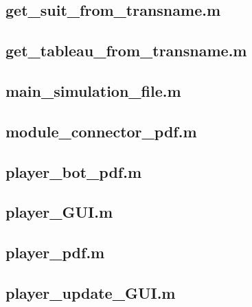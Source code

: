 \documentclass[runningheads,a4paper]{llncs}
\newcommand{\GPenSIM}{../GPenSIM}
\begin{document}
\subsection{get\_suit\_from\_transname.m}
\label{app:get_suit_from_transname.m}


\subsection{get\_tableau\_from\_transname.m}
\label{app:get_tableau_from_transname.m}


\subsection{main\_simulation\_file.m}
\label{app:main_simulation_file.m}


\subsection{module\_connector\_pdf.m}
\label{app:module_connector_pdf.m}


\subsection{player\_bot\_pdf.m}
\label{app:player_bot_pdf.m}


\subsection{player\_GUI.m}
\label{app:player_GUI.m}


\subsection{player\_pdf.m}
\label{app:player_pdf.m}


\subsection{player\_update\_GUI.m}
\label{app:player_update_GUI.m}

\end{document}
